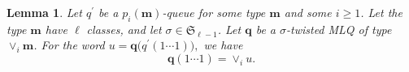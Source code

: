 \documentclass[reqno]{amsart}%
\newcommand{\0}{\phantom{c}}
\theoremstyle{plain}
\newtheorem{lemma}[thm]{Lemma}
\theoremstyle{definition}
\numberwithin{equation}{section}
\begin{document}
\begin{lemma}
\label{lemma:queue_merge} Let $q^{\prime}$ be a $p_{i}(\mathbf{m})$-queue for
some type $\mathbf{m}$ and some $i \geq1$. Let the type $\mathbf{m}$ have
$\ell$ classes, and let $\sigma\in\mathfrak{S}_{\ell-1}$.
Let $\mathbf{q}$ be a $\sigma$-twisted MLQ of type $\vee_{i}\mathbf{m}$.
For the word $u = \mathbf{q}\bigl( q^{\prime}(1 \dotsm1) \bigr), $ we have
\[
\mathbf{q}(1 \dotsm1) = \vee_{i} u.
\]

\end{lemma}
\end{document}
